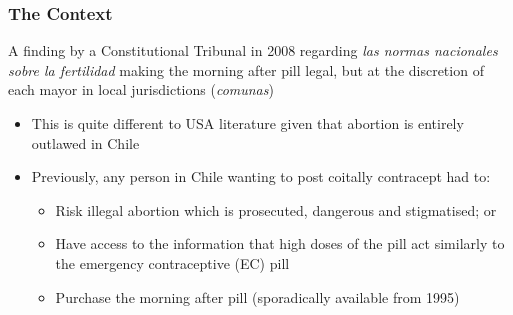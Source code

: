 \documentclass[10pt,letterpaper,subeqn]{beamer}
\begin{document}


\begin{frame}[label=Context]
\frametitle{The Context}
A finding by a Constitutional Tribunal in 2008 regarding \emph{las normas nacionales sobre la fertilidad} making the morning after pill legal, but at the discretion of each mayor in local jurisdictions (\emph{comunas})
\vspace{5mm}
\begin{itemize}
\item This is quite different to USA literature given that abortion is entirely outlawed in Chile
\item Previously, any person in Chile wanting to post coitally contracept had to:
\begin{itemize}
\item Risk illegal abortion which is prosecuted, dangerous and stigmatised; or
\item Have access to the information that high doses of the pill act similarly to the emergency contraceptive (EC) pill
\item Purchase the morning after pill (sporadically available from 1995)
\end{itemize}
\end{itemize}
\hyperlink{PAE}{}
\end{frame}

\end{document}
